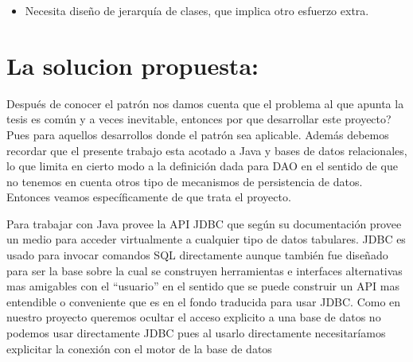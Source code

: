\begin{itemize}
\item Necesita diseño de jerarquía de clases, que implica otro esfuerzo extra. %

\end{itemize}


\section{La solucion propuesta: \jj}
Después de conocer el patrón nos damos cuenta que el problema al que apunta la tesis es común y a veces inevitable, entonces por que desarrollar este proyecto? Pues para aquellos desarrollos donde el patrón sea aplicable. Además debemos recordar que el presente trabajo esta acotado a Java y bases de datos relacionales, lo que limita en cierto modo a la definición dada para DAO en el sentido de que no tenemos en cuenta otros tipo de mecanismos de persistencia de datos. Entonces veamos específicamente de que trata el proyecto.

Para trabajar con \dd Java provee la API JDBC\cite{java:jdbc} que según su documentación provee un medio para acceder virtualmente a cualquier tipo de datos tabulares. JDBC es usado para invocar comandos SQL directamente aunque también fue diseñado para ser la base sobre la cual se construyen herramientas e interfaces alternativas mas amigables con el ``usuario'' en el sentido que se puede construir un API mas entendible o conveniente que es en el fondo traducida para usar JDBC. Como en nuestro proyecto queremos ocultar el acceso explicito a una base de datos no podemos usar directamente JDBC pues al usarlo directamente necesitaríamos explicitar la conexión con el motor de la base de datos
